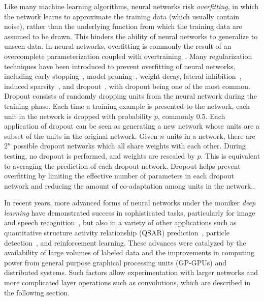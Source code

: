 Like many machine learning algorithms, neural networks risk \textit{overfitting}, in which the network learns to approximate the training data (which usually contain noise), rather than the underlying function from which the training data are assumed to be drawn.
This hinders the ability of neural networks to generalize to unseen data.
In neural networks, overfitting is commonly the result of an overcomplete parameterization coupled with overtraining~\cite{reed1993, dalianis1993}.
Many regularization techniques have been introduced to prevent overfitting of neural networks, including early stopping~\cite{morgan1990}, model pruning~\cite{reed1993}, weight decay\cite{krogh1992}, lateral inhibition~\cite{krizhevsky2012}, induced sparsity~\cite{ng2011, makhzani2015}, and dropout~\cite{srivastava2014}, with dropout being one of the most common. 
Dropout consists of randomly dropping units from the neural network during the training phase.
Each time a training example is presented to the network, each unit in the network is dropped with probability $p$, commonly 0.5.
Each application of dropout can be seen as generating a new network whose units are a subset of the units in the original network.
Given $n$ units in a network, there are $2^n$ possible dropout networks which all share weights with each other.
During testing, no dropout is performed, and weights are rescaled by $p$.
This is equivalent to averaging the prediction of each dropout network.
Dropout helps prevent overfitting by limiting the effective number of parameters in each dropout network and reducing the amount of co-adaptation among units in the network.\cite{srivastava2014}.


In recent years, more advanced forms of neural networks under the moniker \textit{deep learning} have demonstrated success in sophisticated tasks, particularly for image and speech recognition~\cite{krizhevsky2012, lecun2015, masci2011, hinton2012, he2016}, but also in a variety of other applications such as quantitative structure activity relationship (QSAR) prediction~\cite{ma2015}, particle detection~\cite{ciodaro2012}, and reinforcement learning\cite{mnih2015}.
These advances were catalyzed by the availability of large volumes of labeled data\cite{deng2009, krizhevsky2009} and the improvements in computing power from general purpose graphical processing units (GP-GPUs) and distributed systems\cite{chetlur2014, chu2007}.
Such factors allow experimentation with larger networks and more complicated layer operations such as convolutions, which are described in the following section.


